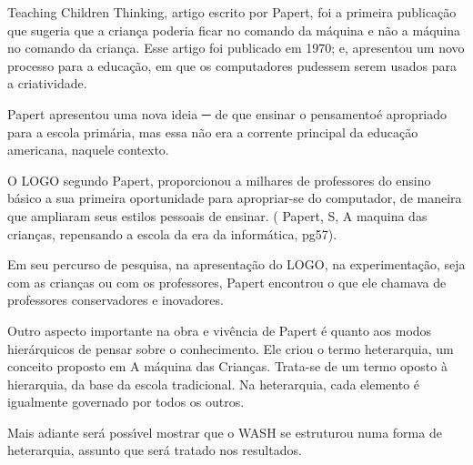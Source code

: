 \documentclass[
12pt,		%
openright,	%
twoside,  %
a4paper,			%
chapter=TITLE,		%
english,			%
french,				%
spanish,			%
brazil				%
]{USPSC-classe/USPSC_RedarTex}
\begin{document}
Teaching Children Thinking, artigo escrito por Papert, foi a primeira publica\c{c}\~ao que sugeria que a crian\c{c}a poderia ficar no comando da m\'aquina e n\~ao a m\'aquina no comando da crian\c{c}a.  Esse artigo  foi publicado em 1970; e,  apresentou um novo processo para a educa\c{c}\~ao, em que os computadores pudessem serem usados para a criatividade.








Papert apresentou uma nova ideia  ─ de que \textquotedbl ensinar o pensamento\textquotedbl   \'e apropriado para a escola prim\'aria, mas essa n\~ao era a corrente principal da educa\c{c}\~ao americana, naquele contexto.








O LOGO segundo Papert,  proporcionou a milhares de professores do ensino b\'asico a sua primeira oportunidade para apropriar-se do computador, de maneira que ampliaram seus estilos pessoais de ensinar. ( Papert, S, \textquotedbl A maquina das crian\c{c}as, repensando a escola da era da inform\'atica\textquotedbl  , pg57).








Em seu percurso de pesquisa, na apresenta\c{c}\~ao do LOGO, na experimenta\c{c}\~ao, seja com as crian\c{c}as ou com os professores, Papert encontrou o que ele chamava de \textquotedbl professores conservadores e  inovadores\textquotedbl  [XXX].








Outro aspecto importante na obra e viv\^encia de Papert \'e quanto aos modos hier\'arquicos de pensar sobre o conhecimento.  Ele criou o termo  \textquotedbl heterarquia\textquotedbl , um conceito proposto em  \textquotedbl A m\'aquina das Crian\c{c}as\textquotedbl . Trata-se de  um termo oposto \`a hierarquia, da base da escola tradicional. Na heterarquia, cada elemento \'e igualmente governado por todos os outros.








Mais adiante ser\'a poss\'{\i}vel mostrar que o WASH se estruturou numa forma de heterarquia, assunto que ser\'a tratado nos resultados.
\end{document}
